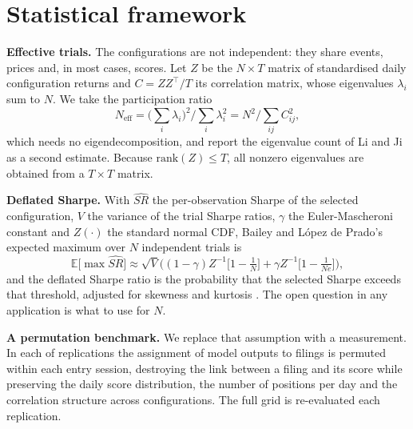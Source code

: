 \documentclass[sigconf]{acmart}
\begin{document}
\section{Statistical framework}
\label{sec:stats}

\textbf{Effective trials.} The configurations are not independent: they share events, prices and, in
most cases, scores. Let $Z$ be the $N \times T$ matrix of standardised daily configuration returns
and $C = ZZ^\top/T$ its correlation matrix, whose eigenvalues $\lambda_i$ sum to $N$. We take the
participation ratio
\begin{equation}
N_{\mathrm{eff}} = \Big(\textstyle\sum_i \lambda_i\Big)^2 \Big/ \textstyle\sum_i \lambda_i^2
= N^2 \Big/ \textstyle\sum_{ij} C_{ij}^2 ,
\label{eq:neff}
\end{equation}
which needs no eigendecomposition, and report the eigenvalue count of Li and Ji
\cite{li2005adjusting} as a second estimate. Because $\mathrm{rank}(Z) \le T$, all nonzero
eigenvalues are obtained from a $T \times T$ matrix.

\textbf{Deflated Sharpe.} With $\widehat{SR}$ the per-observation Sharpe of the selected
configuration, $V$ the variance of the trial Sharpe ratios, $\gamma$ the Euler-Mascheroni constant
and $Z(\cdot)$ the standard normal CDF, Bailey and L\'opez de Prado's expected maximum over $N$
independent trials is
\begin{equation}
\mathbb{E}\big[\max \widehat{SR}\big] \approx
\sqrt{V}\Big((1-\gamma)Z^{-1}\big[1-\tfrac{1}{N}\big] + \gamma Z^{-1}\big[1-\tfrac{1}{Ne}\big]\Big),
\label{eq:emax}
\end{equation}
and the deflated Sharpe ratio is the probability that the selected Sharpe exceeds that threshold,
adjusted for skewness and kurtosis \cite{bailey2014deflated}. The open question in any application
is what to use for $N$.

\textbf{A permutation benchmark.} We replace that assumption with a measurement. In each of
\PermReps{} replications the assignment of model outputs to filings is permuted within each entry
session, destroying the link between a filing and its score while preserving the daily score
distribution, the number of positions per day and the correlation structure across configurations.
The full grid is re-evaluated each replication.
\end{document}
